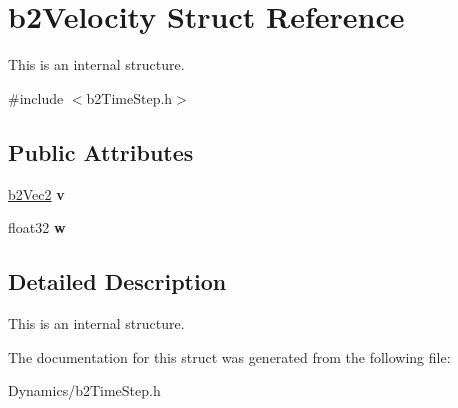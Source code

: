 \hypertarget{structb2Velocity}{}\section{b2\+Velocity Struct Reference}
\label{structb2Velocity}


This is an internal structure.  




{\ttfamily \#include $<$b2\+Time\+Step.\+h$>$}

\subsection*{Public Attributes}
\begin{DoxyCompactItemize}
\item 
\mbox{\label{structb2Velocity_a73b92ceff532491e71b9dbc53eecaa70}} 
\mbox{\hyperlink{structb2Vec2}{b2\+Vec2}} {\bfseries v}
\item 
\mbox{\label{structb2Velocity_a6ce6f6c83ceb95100532d3f2b0485b83}} 
float32 {\bfseries w}
\end{DoxyCompactItemize}


\subsection{Detailed Description}
This is an internal structure. 

The documentation for this struct was generated from the following file\+:\begin{DoxyCompactItemize}
\item 
Dynamics/b2\+Time\+Step.\+h\end{DoxyCompactItemize}
